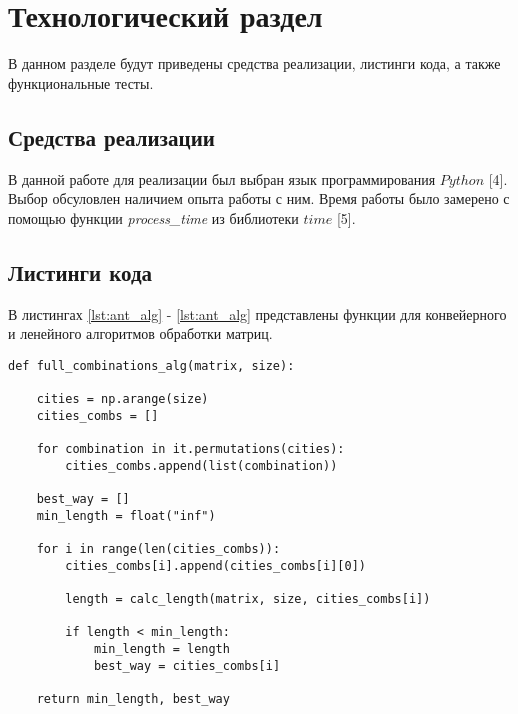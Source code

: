 \chapter{Технологический раздел}
\label{cha:impl}


В данном разделе будут приведены средства реализации, листинги кода, а также функциональные тесты.


\section{Средства реализации}

В данной работе для реализации был выбран язык программирования $Python$ [4]. Выбор обсуловлен наличием опыта работы с ним. Время работы было замерено с помощью функции \textit{process\_time} из библиотеки $time$ [5].

\section{Листинги кода}

В листингах \ref{lst:ant_alg} - \ref{lst:ant_alg} представлены функции для конвейерного и ленейного алгоритмов обработки матриц.

\begin{center}
\captionsetup{justification=raggedright,singlelinecheck=off}
\begin{lstlisting}[label=lst:full_combinations_alg,caption=Алгоритм полного перебора]
def full_combinations_alg(matrix, size):

	cities = np.arange(size)
	cities_combs = []

	for combination in it.permutations(cities):
		cities_combs.append(list(combination))

	best_way = []
	min_length = float("inf")

	for i in range(len(cities_combs)):
		cities_combs[i].append(cities_combs[i][0])

		length = calc_length(matrix, size, cities_combs[i])

		if length < min_length:
			min_length = length
			best_way = cities_combs[i]

	return min_length, best_way
\end{lstlisting}
\end{center}	

\clearpage

